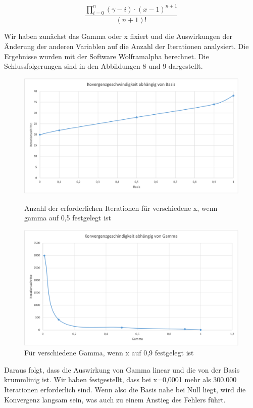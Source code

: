 \documentclass[course=erap]{aspdoc}
\begin{document}
\[
\frac{{\prod_{i=0}^{n} (\gamma - i) \cdot (x-1)^{n+1}}}{{(n+1)!}} \label{eq:gamma_product}
\]

\par
Wir haben zunächst das Gamma oder x fixiert und die Auswirkungen der Änderung der anderen Variablen auf die Anzahl der Iterationen analysiert. Die Ergebnisse wurden mit der Software Wolframalpha berechnet. Die Schlussfolgerungen sind in den Abbildungen 8 und 9 dargestellt.

\begin{figure}[h]
\centering
\begin{minipage}{0.48\textwidth}
\centering
\includegraphics[width=0.8\linewidth]{Bilder/KonvergenzBasis.png}
\caption{Anzahl der erforderlichen Iterationen für verschiedene x, wenn gamma auf 0,5 festgelegt ist}
\label{fig:xchange}
\end{minipage}\hfill
\begin{minipage}{0.48\textwidth}
\centering
\includegraphics[width=0.8\linewidth]{Bilder/KonvergenzGamma.png}
\caption{Für verschiedene Gamma, wenn x auf 0,9 festgelegt ist}
\label{fig:gammachange}
\end{minipage}
\end{figure}

    
\par
Daraus folgt, dass die Auswirkung von Gamma linear und die von der Basis krummlinig ist. Wir haben festgestellt, dass bei x=0,0001 mehr als 300.000 Iterationen erforderlich sind. Wenn also die Basis nahe bei Null liegt, wird die Konvergenz langsam sein, was auch zu einem Anstieg des Fehlers führt.
\end{document}
